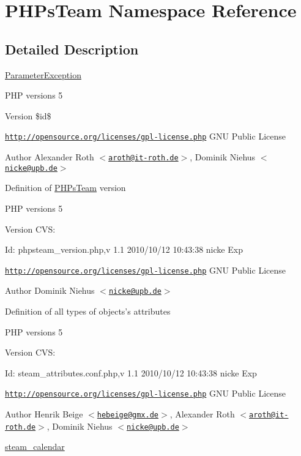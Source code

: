 \hypertarget{namespace_p_h_ps_team}{
\section{PHPsTeam Namespace Reference}
\label{namespace_p_h_ps_team}
}


\subsection{Detailed Description}
\hyperlink{class_parameter_exception}{ParameterException}

PHP versions 5

\begin{DoxyVersion}{Version}
\$id\$
\end{DoxyVersion}
\href{http://opensource.org/licenses/gpl-license.php}{\tt http://opensource.org/licenses/gpl-\/license.php} GNU Public License \begin{DoxyAuthor}{Author}
Alexander Roth $<$\href{mailto:aroth@it-roth.de}{\tt aroth@it-\/roth.de}$>$, Dominik Niehus $<$\href{mailto:nicke@upb.de}{\tt nicke@upb.de}$>$
\end{DoxyAuthor}
Definition of \hyperlink{namespace_p_h_ps_team}{PHPsTeam} version

PHP versions 5

\begin{DoxyVersion}{Version}
CVS: 
\end{DoxyVersion}
\begin{DoxyParagraph}{Id:}
phpsteam\_\-version.php,v 1.1 2010/10/12 10:43:38 nicke Exp 
\end{DoxyParagraph}


\href{http://opensource.org/licenses/gpl-license.php}{\tt http://opensource.org/licenses/gpl-\/license.php} GNU Public License \begin{DoxyAuthor}{Author}
Dominik Niehus $<$\href{mailto:nicke@upb.de}{\tt nicke@upb.de}$>$
\end{DoxyAuthor}
Definition of all types of objects's attributes

PHP versions 5

\begin{DoxyVersion}{Version}
CVS: 
\end{DoxyVersion}
\begin{DoxyParagraph}{Id:}
steam\_\-attributes.conf.php,v 1.1 2010/10/12 10:43:38 nicke Exp 
\end{DoxyParagraph}


\href{http://opensource.org/licenses/gpl-license.php}{\tt http://opensource.org/licenses/gpl-\/license.php} GNU Public License \begin{DoxyAuthor}{Author}
Henrik Beige $<$\href{mailto:hebeige@gmx.de}{\tt hebeige@gmx.de}$>$, Alexander Roth $<$\href{mailto:aroth@it-roth.de}{\tt aroth@it-\/roth.de}$>$, Dominik Niehus $<$\href{mailto:nicke@upb.de}{\tt nicke@upb.de}$>$
\end{DoxyAuthor}
\hyperlink{classsteam__calendar}{steam\_\-calendar}

